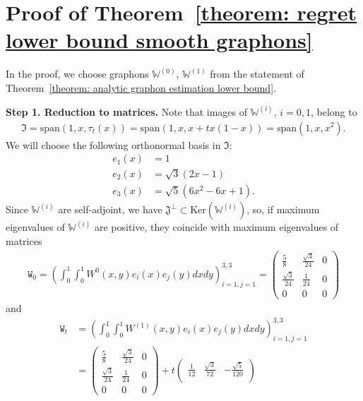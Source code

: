 \documentclass[11pt]{article}
\newcommand{\bbW}{\mathbb{W}}
\newcommand{\<}{\langle}
\renewcommand{\>}{\rangle}
\newcommand{\ttW}{\mathtt{W}}
\theoremstyle{plain}
\theoremstyle{definition}
\theoremstyle{remark}
\begin{document}
{\section{Proof of Theorem~\ref{theorem: regret lower bound smooth graphons}}

    In the proof, we choose graphons $\bbW^{(0)}$, $\bbW^{(1)}$ from the statement of Theorem~\ref{theorem: analytic graphon estimation lower bound}.

   \noindent \textbf{Step 1. Reduction to matrices.} Note that images of $\bbW^{(i)}$, $i = 0, 1$, belong to 
   \begin{align*}
        \mathfrak{I} = \mathrm{span}(1, x, \tau_t(x)) = \mathrm{span}(1, x, x + t x (1 - x)) = \mathrm{span}(1, x, x^2).
   \end{align*}
   We will choose the following orthonormal basis in $\mathfrak{I}$:
   \begin{align*}
        e_1(x) & = 1 \\
        e_2(x) & = \sqrt{3} (2x - 1) \\
        e_3(x) & = \sqrt{5}(6 x^2 - 6x + 1).
   \end{align*}
   Since $\bbW^{(i)}$ are self-adjoint, we have $\mathfrak{J}^{\perp} \subset \mathrm{Ker}(\bbW^{(i)})$, so, if maximum eigenvalues of $\bbW^{(i)}$ are positive, they coincide with maximum eigenvalues of matrices
   \begin{align*}
    \ttW_0 = \left ( \int_{0}^1 \int_{0}^{1} W^{0}(x, y) e_i(x) e_j(y) dx dy \right )_{i = 1, j = 1}^{3, 3} = \begin{pmatrix}
        \frac{5}{8} & \frac{\sqrt{3}}{24} & 0 \\
        \frac{\sqrt{3}}{24} & \frac{1}{24} & 0 \\
        0 & 0  & 0
    \end{pmatrix}
   \end{align*}
   and
   \begin{align}
        \ttW_t & = \left ( \int_{0}^1 \int_{0}^{1} W^{(1)}(x, y) e_i(x) e_j(y) dx dy \right )_{i = 1, j = 1}^{3, 3} \nonumber \\
        & = \begin{pmatrix}
        \frac{5}{8} & \frac{\sqrt{3}}{24} & 0 \\
        \frac{\sqrt{3}}{24} & \frac{1}{24} & 0 \\
        0 & 0  & 0
       \end{pmatrix} + t \begin{pmatrix}
        \frac{1}{12} & \frac{\sqrt{3}}{72} & - \frac{\sqrt{5}}{120} \\

\end{pmatrix}
\end{align}}
\end{document}
